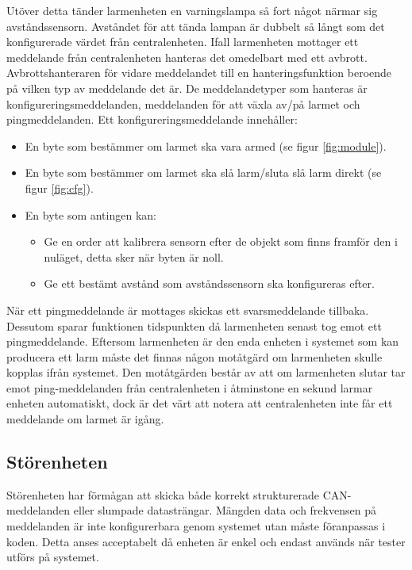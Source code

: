 \newline\newline
Utöver detta tänder larmenheten en varningslampa så fort något närmar sig avståndssensorn. Avståndet för att tända lampan är dubbelt så långt som det konfigurerade värdet från centralenheten.
\newline\newline
Ifall larmenheten mottager ett meddelande från centralenheten hanteras det omedelbart med ett avbrott. Avbrottshanteraren för vidare meddelandet till en hanteringsfunktion beroende på vilken typ av meddelande det är. De meddelandetyper som hanteras är konfigureringsmeddelanden, meddelanden för att växla av/på larmet och pingmeddelanden. Ett konfigureringsmeddelande innehåller:\newline
\begin{itemize}
    \item En byte som bestämmer om larmet ska vara armed (se figur \ref{fig:module}).
    \item En byte som bestämmer om larmet ska slå larm/sluta slå larm direkt (se figur \ref{fig:cfg}).
    \item En byte som antingen kan:
    \begin{itemize}
        \item Ge en order att kalibrera sensorn efter de objekt som finns framför den i nuläget, detta sker när byten är noll.
        \item Ge ett bestämt avstånd som avståndssensorn ska konfigureras efter.
    \end{itemize}
\end{itemize}


När ett pingmeddelande är mottages skickas ett svarsmeddelande tillbaka. Dessutom sparar funktionen tidspunkten då larmenheten senast tog emot ett pingmeddelande. Eftersom larmenheten är den enda enheten i systemet som kan producera ett larm måste det finnas någon motåtgärd om larmenheten skulle kopplas ifrån systemet. Den motåtgärden består av att om larmenheten slutar tar emot ping-meddelanden från centralenheten i åtminstone en sekund larmar enheten automatiskt, dock är det värt att notera att centralenheten inte får ett meddelande om larmet är igång.


\subsection{Störenheten}
\label{sec:störenhet}
Störenheten har förmågan att skicka både korrekt strukturerade CAN-meddelanden eller slumpade datasträngar. Mängden data och frekvensen på meddelanden är inte konfigurerbara genom systemet utan måste föranpassas i koden. Detta anses acceptabelt då enheten är enkel och endast används när tester utförs på systemet. 


